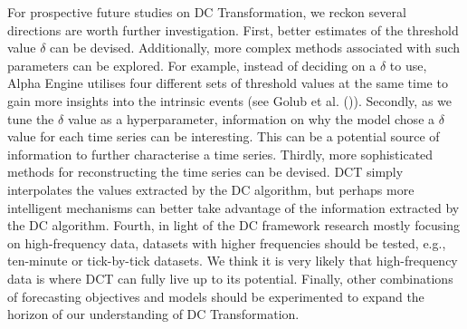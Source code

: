 For prospective future studies on DC Transformation, we reckon several directions are worth further investigation. First, better estimates of the threshold value $\delta$ can be devised. Additionally, more complex methods associated with such parameters can be explored. For example, instead of deciding on a $\delta$ to use, Alpha Engine utilises four different sets of threshold values at the same time to gain more insights into the intrinsic events (see Golub et al. (\citeyear{golub2018alpha})). Secondly, as we tune the $\delta$ value as a hyperparameter, information on why the model chose a $\delta$ value for each time series can be interesting. This can be a potential source of information to further characterise a time series. Thirdly, more sophisticated methods for reconstructing the time series can be devised. DCT simply interpolates the values extracted by the DC algorithm, but perhaps more intelligent mechanisms can better take advantage of the information extracted by the DC algorithm. Fourth, in light of the DC framework research mostly focusing on high-frequency data, datasets with higher frequencies should be tested, e.g., ten-minute or tick-by-tick datasets. We think it is very likely that high-frequency data is where DCT can fully live up to its potential. Finally, other combinations of forecasting objectives and models should be experimented to expand the horizon of our understanding of DC Transformation.
